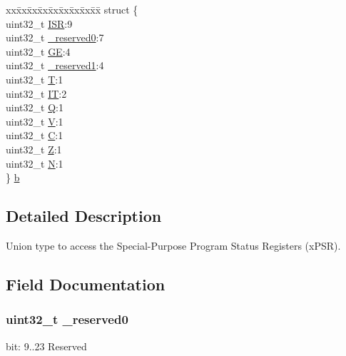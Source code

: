 \begin{DoxyCompactItemize}
\begin{tabbing}
\end{tabbing}\item 
\begin{tabbing}
xx\=xx\=xx\=xx\=xx\=xx\=xx\=xx\=xx\=\kill
struct \{\\
\>uint32\_t \hyperlink{unionx_p_s_r___type_ad502ba7dbb2aab5f87c782b28f02622d}{ISR}:9\\
\>uint32\_t \hyperlink{unionx_p_s_r___type_ac8a6a13838a897c8d0b8bc991bbaf7c1}{\_reserved0}:7\\
\>uint32\_t \hyperlink{unionx_p_s_r___type_aa91800ec6e90e457c7a1acd1f2e17099}{GE}:4\\
\>uint32\_t \hyperlink{unionx_p_s_r___type_a959a73d8faee56599b7e792a7c5a2d16}{\_reserved1}:4\\
\>uint32\_t \hyperlink{unionx_p_s_r___type_a6e1cf12e53a20224f6f62c001d9be972}{T}:1\\
\>uint32\_t \hyperlink{unionx_p_s_r___type_a76485660fe8ad98cdc71ddd7cb0ed777}{IT}:2\\
\>uint32\_t \hyperlink{unionx_p_s_r___type_a65f27ddc4f7e09c14ce7c5211b2e000a}{Q}:1\\
\>uint32\_t \hyperlink{unionx_p_s_r___type_acd4a2b64faee91e4a9eef300667fa222}{V}:1\\
\>uint32\_t \hyperlink{unionx_p_s_r___type_a7a1caf92f32fe9ebd8d1fe89b06c7776}{C}:1\\
\>uint32\_t \hyperlink{unionx_p_s_r___type_a5ae954cbd9986cd64625d7fa00943c8e}{Z}:1\\
\>uint32\_t \hyperlink{unionx_p_s_r___type_abae0610bc2a97bbf7f689e953e0b451f}{N}:1\\
\} \hyperlink{unionx_p_s_r___type_a1b59d9c685f4e15edd10b7dc1eeae4c1}{b}\\

\end{tabbing}\end{DoxyCompactItemize}


\subsection{Detailed Description}
Union type to access the Special-\/\-Purpose Program Status Registers (x\-P\-S\-R). 

\subsection{Field Documentation}
\hypertarget{unionx_p_s_r___type_ac8a6a13838a897c8d0b8bc991bbaf7c1}{
\subsubsection[{\-\_\-reserved0}]{\setlength{\rightskip}{0pt plus 5cm}uint32\-\_\-t \-\_\-reserved0}}\label{unionx_p_s_r___type_ac8a6a13838a897c8d0b8bc991bbaf7c1}
bit\-: 9..23 Reserved

